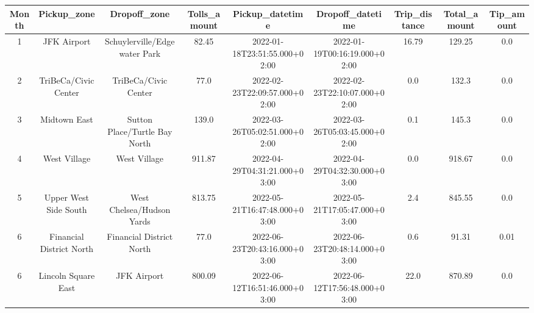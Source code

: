 \begin{tabular}{|c|c|c|c|c|c|c|c|c|}
\hline
Month&Pickup\_zone&Dropoff\_zone&Tolls\_amount&Pickup\_datetime&Dropoff\_datetime&Trip\_distance&Total\_amount&Tip\_amount \\ 
\hline
\hline
1&JFK Airport&Schuylerville/Edgewater Park&82.45&2022-01-18T23:51:55.000+02:00&2022-01-19T00:16:19.000+02:00&16.79&129.25&0.0 \\ 
\hline
2&TriBeCa/Civic Center&TriBeCa/Civic Center&77.0&2022-02-23T22:09:57.000+02:00&2022-02-23T22:10:07.000+02:00&0.0&132.3&0.0 \\ 
\hline
3&Midtown East&Sutton Place/Turtle Bay North&139.0&2022-03-26T05:02:51.000+02:00&2022-03-26T05:03:45.000+02:00&0.1&145.3&0.0 \\ 
\hline
4&West Village&West Village&911.87&2022-04-29T04:31:21.000+03:00&2022-04-29T04:32:30.000+03:00&0.0&918.67&0.0 \\ 
\hline
5&Upper West Side South&West Chelsea/Hudson Yards&813.75&2022-05-21T16:47:48.000+03:00&2022-05-21T17:05:47.000+03:00&2.4&845.55&0.0 \\ 
\hline
6&Financial District North&Financial District North&77.0&2022-06-23T20:43:16.000+03:00&2022-06-23T20:48:14.000+03:00&0.6&91.31&0.01 \\ 
\hline
6&Lincoln Square East&JFK Airport&800.09&2022-06-12T16:51:46.000+03:00&2022-06-12T17:56:48.000+03:00&22.0&870.89&0.0 \\ 
\hline
\end{tabular}